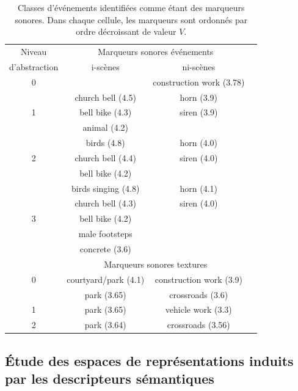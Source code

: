 \begin{table}[t]
 \setlength{\tabcolsep}{0.2pt}
 \centering
  {\renewcommand{\arraystretch}{0.9}
\begin{tabular}{c c c c} 
Niveau        & \multicolumn{2}{c}{Marqueurs sonores événements} \\
d'abstraction & i-scènes & ni-scènes \\
\hline
0  &                               &  construction work (3.78)  \\
\hline
  & church bell  (4.5)             & horn  (3.9) \\
1 & bell bike    (4.3)             & siren (3.9)\\
  & animal       (4.2)             &       \\
   \hline
  & birds        (4.8)             & horn  (4.0)\\
2 & church bell  (4.4)             & siren (4.0)\\
  & bell bike    (4.2)             &       \\
   \hline
  & birds singing (4.8)            & horn  (4.1)\\
  & church bell   (4.3)            & siren (4.0)\\
3 & bell bike     (4.2)            &       \\
  & male footsteps                 &  \\
  &   concrete (3.6)               &  \\
  \hline
  \hline
          & \multicolumn{2}{c}{Marqueurs sonores textures}      \\
\hline
0         &     courtyard/park (4.1) &  construction work (3.9)  \\
\hline
          &     park (3.65)           &  crossroads (3.6)  \\
1         &     park (3.65)           &  vehicle work (3.3)  \\
\hline
2         &     park (3.64)           &  crossroads (3.56)  \\
\end{tabular}
}
\vspace{0.5mm}
\caption[Classes d'événements identifiées  comme étant des marqueurs sonores]{Classes d'événements identifiées comme étant des marqueurs sonores. Dans chaque cellule, les marqueurs sont ordonnés par ordre décroissant de valeur $V$.}
\label{tab:markers}
\end{table}

\subsection{Étude des espaces de représentations induits par les descripteurs sémantiques}


